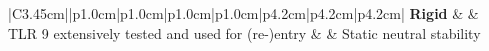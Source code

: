 {\begin{tabular}{|C{3.45cm}||p{1.0cm}|p{1.0cm}|p{1.0cm}|p{1.0cm}|p{4.2cm}|p{4.2cm}|p{4.2cm}|}
		\textbf{\newline \newline Rigid}    &   & TLR 9 \newline extensively tested and used for (re-)entry &  & Static neutral stability \\[13ex] \hline
	\end{tabular}
}

